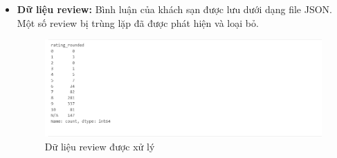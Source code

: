 \begin{itemize}
    \item \textbf{Dữ liệu review:} Bình luận của khách sạn được lưu dưới dạng file JSON. Một số review bị trùng lặp đã được phát hiện và loại bỏ. 
    \begin{figure}[H] %
        \centering
        \includegraphics[width=1.0\linewidth]{Figures/2.18.png}
        \caption{Dữ liệu review được xử lý}
        \label{fig:iot}
    \end{figure}
    

\end{itemize}
